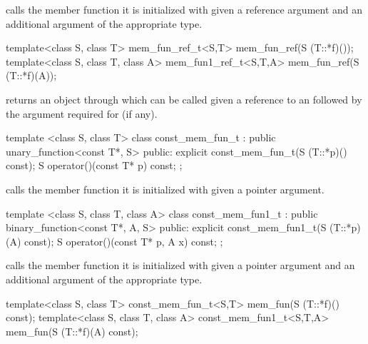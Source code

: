 \begin{itemdescr}
\pnum
{} calls the member function it is initialized with
given a reference argument and an additional argument of the appropriate type.
\end{itemdescr}

%
\begin{itemdecl}
template<class S, class T> mem_fun_ref_t<S,T>
   mem_fun_ref(S (T::*f)());
template<class S, class T, class A> mem_fun1_ref_t<S,T,A>
   mem_fun_ref(S (T::*f)(A));
\end{itemdecl}

\begin{itemdescr}
\pnum
{} returns an object through which 
can be called given a reference to an  followed by the argument
required for  (if any).
\end{itemdescr}

%
\begin{itemdecl}
template <class S, class T> class const_mem_fun_t
      : public unary_function<const T*, S> {
public:
  explicit const_mem_fun_t(S (T::*p)() const);
  S operator()(const T* p) const;
};
\end{itemdecl}

\begin{itemdescr}
\pnum
{} calls the member function it is initialized with
given a pointer argument.
\end{itemdescr}

%
\begin{itemdecl}
template <class S, class T, class A> class const_mem_fun1_t
      : public binary_function<const T*, A, S> {
public:
  explicit const_mem_fun1_t(S (T::*p)(A) const);
  S operator()(const T* p, A x) const;
};
\end{itemdecl}

\begin{itemdescr}
\pnum
{} calls the member function it is initialized with
given a pointer argument and an additional argument of the appropriate type.
\end{itemdescr}

%
\begin{itemdecl}
template<class S, class T> const_mem_fun_t<S,T>
   mem_fun(S (T::*f)() const);
template<class S, class T, class A> const_mem_fun1_t<S,T,A>
   mem_fun(S (T::*f)(A) const);
\end{itemdecl}

